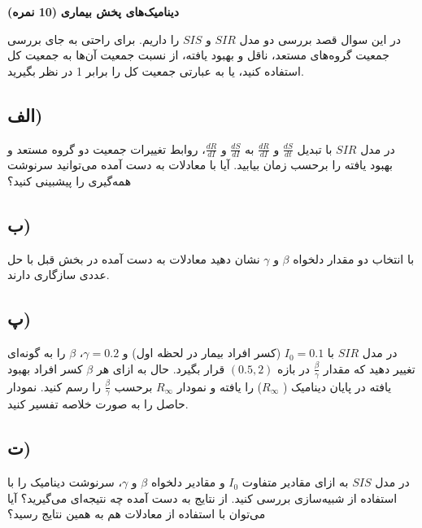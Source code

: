 \Large \textbf{دینامیک‌های پخش بیماری}
\large \textbf{(10 نمره)}

\normalsize \vspace{0.5cm}
در این سوال قصد بررسی دو مدل 
$SIR$ و $SIS$ را داریم. برای راحتی به جای بررسی جمعیت گروه‌های مستعد، ناقل و بهبود یافته، از نسبت جمعیت آن‌ها به جمعیت کل استفاده کنید، یا به عبارتی جمعیت کل را برابر 1 در نظر بگیرید.
\subsection*{الف)}
در مدل 
$SIR$ 
با تبدیل 
$\frac{dS}{dt}$ و $\frac{dR}{dI}$ به
$\frac{dS}{dI}$ و $\frac{dR}{dI}$، روابط تغییرات جمعیت دو گروه مستعد و بهبود یافته را برحسب زمان بیابید. آیا با معادلات به دست آمده می‌توانید سرنوشت همه‌گیری را پیشبینی کنید؟ 
\subsection*{ب)}
با انتخاب دو مقدار دلخواه 
$\beta$ و $\gamma$ نشان دهید معادلات به دست آمده در بخش قبل با حل عددی سازگاری دارند.

\subsection*{پ)}
در مدل 
$SIR$ 
با 
$I_0=0.1$ (کسر افراد بیمار در لحظه اول) و 
$\gamma=0.2$، 
$\beta$ را به گونه‌ای تغییر دهید که مقدار 
$\frac{\beta}{\gamma}$ در بازه 
$(0.5,2)$ قرار بگیرد. حال به ازای هر 
$\beta$ کسر افراد بهبود یافته در پایان دینامیک (
$R_{\infty}$) را یافته و نمودار 
$R_{\infty}$ برحسب 
$\frac{\beta}{\gamma}$ را رسم کنید. نمودار حاصل را به صورت خلاصه تفسیر کنید.
\subsection*{ت)}
در مدل 
$SIS$
به ازای مقادیر متفاوت 
$I_0$ و مقادیر دلخواه
$\beta$ و $\gamma$، سرنوشت دینامیک را با استفاده از شبیه‌سازی بررسی کنید. از 
نتایج به دست آمده چه نتیجه‌ای می‌گیرید؟
آیا می‌توان با استفاده از معادلات هم به همین نتایج رسید؟